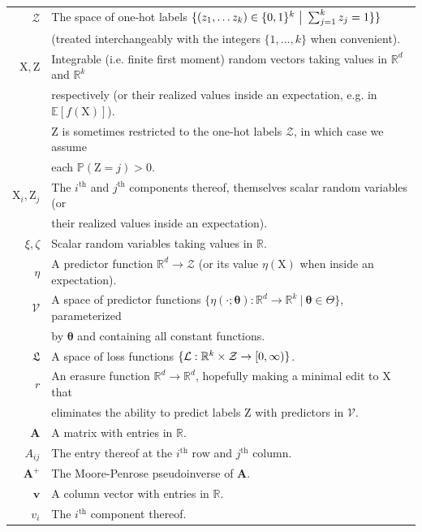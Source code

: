 \documentclass{article}
\theoremstyle{plain}
\theoremstyle{remark}
\newcommand{\vtheta}{{ \boldsymbol \theta}}
\newcommand{\E}{\mathbb E}
\theoremstyle{plain}
\theoremstyle{TheoremNum}
\newcommand{\rv}[1]{{\mathrm{#1}}}
\newcommand{\loss}{\color{black} \mathcal{L}}
\begin{document}
\begin{tabular}{r l}
    $\mathcal Z$ & The space of one-hot labels $\{(z_1, \ldots z_k) \in \mathbb \{0, 1\}^k\ \big|\ \sum_{j=1}^k z_j = 1\}\}$ \\
    & (treated interchangeably with the integers $\{1, \ldots, k\}$ when convenient).\\
    $\rv X, \rv Z$ & Integrable (i.e. finite first moment) random vectors taking values in $\mathbb R^d$ and $\mathbb R^k$\\ & respectively (or their realized values inside an expectation, e.g. in $\E[f(\rv X)]$).\\
    & $\rv Z$ is sometimes restricted to the one-hot labels $\mathcal Z$, in which case we assume\\
    & each $\mathbb P(\rv Z = j) > 0$. \\
    $\rv X_i, \rv Z_j$ & The $i^\text{th}$ and $j^\text{th}$ components thereof, themselves scalar random variables (or\\
    & their realized values inside an expectation). \\

    $\xi, \zeta$ & Scalar random variables taking values in $\mathbb R$.\\
    $\eta$ & A predictor function $\mathbb R^d \to \mathcal Z$ (or its value $\eta(\rv X)$ when inside an expectation). \\

    $\mathcal V$ & A space of predictor functions $\{\eta(\cdot; \vtheta): \mathbb R^d \to \mathbb R^k\ |\ \vtheta \in \Theta\}$, parameterized\\
    & by $\vtheta$ and containing all constant functions. \\
    $\mathfrak L$ & A space of loss functions $\{\loss: \mathbb R^k \times \mathcal Z \to [0, \infty)\}$. \\

    $r$ & An erasure function $\mathbb R^d \to \mathbb R^d$, hopefully making a minimal edit to $\rv X$ that\\
    &eliminates the ability to predict labels $\rv Z$ with predictors in $\mathcal V$.\\

    $\mathbf{A}$ & A matrix with entries in $\mathbb R$. \\
    $A_{ij}$ & The entry thereof at the $i^\text{th}$ row and $j^\text{th}$ column. \\
    $\mathbf{A}^+$ & The Moore-Penrose pseudoinverse of $\mathbf{A}$.\\
    $\mathbf{v}$ & A column vector with entries in $\mathbb R$. \\
    $v_i$ & The $i^\text{th}$ component thereof. \\
\end{tabular}
\end{document}
